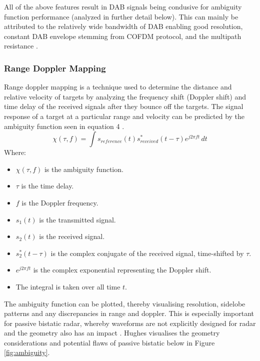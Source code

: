 \documentclass[12pt,a4paper]{article}
\begin{document}
\par \vspace{0.5cm} 
\noindent All of the above features result in DAB signals being condusive for ambiguity function performance (analyzed in further detail below). This can mainly be attributed to the relatively wide bandwidth of DAB enabling good resolution, constant DAB envelope stemming from COFDM protocol, and the multipath resistance \cite{DABambiguity}.
\subsubsection{Range Doppler Mapping}
Range doppler mapping is a technique used to determine the distance and relative velocity of targets by analyzing the frequency shift (Doppler shift) and time delay of the received signals after they bounce off the targets. The signal response of a target at a particular range and velocity can be predicted by the ambiguity function seen in equation 4 \cite{INTRO2017}. 
\begin{equation}
    \chi(\tau, f) = \int s_{reference}(t) s_{received}^*(t - \tau) e^{j2\pi f t} \, dt
\end{equation}
Where:
\begin{multicols}{2}
\begin{itemize}
\item \( \chi(\tau, f) \) is the ambiguity function.
\item \( \tau \) is the time delay.
\item \( f \) is the Doppler frequency.
\item \( s_1(t) \) is the transmitted signal.
\item \( s_2(t) \) is the received signal.
\item \( s_2^*(t - \tau) \) is the complex conjugate of the received signal, time-shifted by \( \tau \).
\item \( e^{j2\pi f t} \) is the complex exponential representing the Doppler shift.
\item The integral is taken over all time \( t \).
\end{itemize}
\end{multicols}
\noindent The ambiguity function can be plotted, thereby visualising resolution, sidelobe patterns and any discrepancies in range and doppler. This is especially important for passive bistatic radar, whereby waveforms are not explicitly designed for radar and the geometry also has an impact \cite{FundamentalsPassiveRadar}. Hughes visualises the geometry considerations and potential flaws of passive bistatic below in Figure \ref{fig:ambiguity}.
\end{document}

